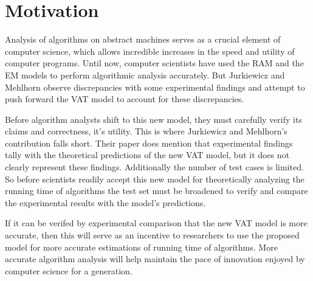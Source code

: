 \section{Motivation}

Analysis of algorithms on abstract machines serves as a crucial element of
computer science, which allows incredible increases in the speed and utility
of computer programs. Until now, computer scientists have used the RAM and the
EM models to perform algorithmic analysis accurately. But Jurkiewicz and
Mehlhorn observe discrepancies with some experimental findings and attempt to
push forward the VAT model to account for these discrepancies. 

Before algorithm analysts shift to this new model, they must carefully verify
its claims and correctness, it's utility. This is where Jurkiewicz and
Mehlhorn's contribution falls short. Their paper does mention that experimental
findings tally with the theoretical predictions of the new VAT model, but it
does not clearly represent these findings. Additionally the number of test
cases is limited. So before scientists readily accept this new model for
theoretically analyzing the running time of algorithms the test set must be
broadened to verify and compare the experimental results with the model's
predictions. 

If it can be verifed by experimental comparison that the new VAT model is more
accurate, then this will serve as an incentive to researchers to use the
proposed model for more accurate estimations of running time of algorithms.
More accurate algorithm analysis will help maintain the pace of innovation
enjoyed by computer science for a generation.